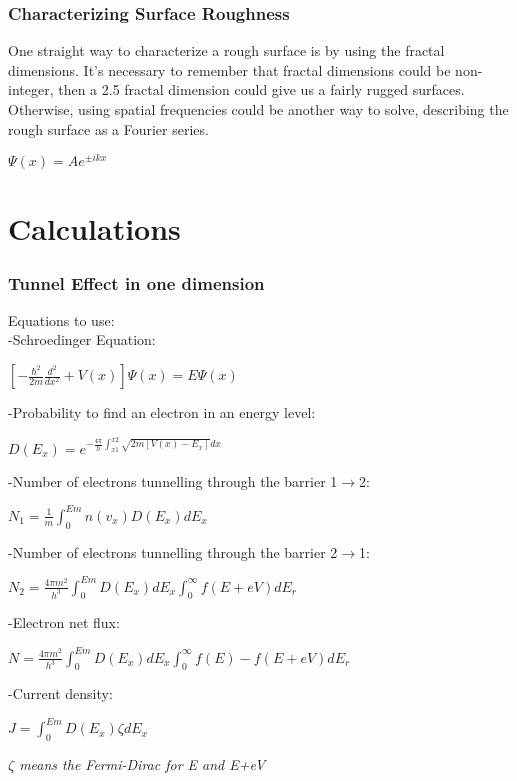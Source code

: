 \documentclass[11pt,a4paper,draft]{article}
\begin{document}
\section{Characterizing Surface Roughness}
One straight way to characterize a rough surface is by using the fractal dimensions. It's necessary to remember that fractal dimensions could be non-integer, then a 2.5 fractal dimension could give us a fairly rugged surfaces. Otherwise, using spatial frequencies could be another way to solve, describing the rough surface as a Fourier series.\\
\begin{center}
$\Psi (x)=A{ e }^{ \pm ikx }$
\end{center}
\part{Calculations}
\section{Tunnel Effect in one dimension}
Equations to use:\\
-Schroedinger Equation:
\begin{center}
$ \left[ -\frac { { \hbar  }^{ 2 } }{ 2m } \frac { { d }^{ 2 } }{ d{ x }^{ 2 } } +V(x) \right] \Psi (x)=E\Psi (x) $\\
\end{center}
-Probability to find an electron in an energy level:
\begin{center}
$ \displaystyle D({ E }_{ x })={ e }^{ -\frac { 4\pi  }{ h } \int _{ x1 }^{ x2 }{ \sqrt { 2m[V(x)-{ E }_{ x }] } dx }  } $
\end{center}
-Number of electrons tunnelling through the barrier 1$ \rightarrow $2:\\
\begin{center}
$ \displaystyle { N }_{ 1 }=\frac { 1 }{ m } \int _{ 0 }^{ Em }{ n({ v }_{ x })D(E_{ x })d } E_{ x } $
\end{center}
-Number of electrons tunnelling through the barrier 2$ \rightarrow $1:\\
\begin{center}
$ \displaystyle { N }_{ 2 }=\frac { 4\pi { m }^{ 2 } }{ { h }^{ 3 } } \int _{ 0 }^{ Em }{ D(E_{ x })d } E_{ x }\int _{ 0 }^{ \infty  }{ f(E+eV)d } E_{ r } $
\end{center}
-Electron net flux:\\
\begin{center}
$\displaystyle { N }=\frac { 4\pi { m }^{ 2 } }{ { h }^{ 3 } } \int _{ 0 }^{ Em }{ D(E_{ x })d } E_{ x }\int _{ 0 }^{ \infty  }{ f(E)-f(E+eV)d } E_{ r } $
\end{center}
-Current density:\\
\begin{center}
$ J=\int _{ 0 }^{ Em }{ D({ E }_{ x })\zeta d } { E }_{ x } $\\ \begin{tiny}
\emph{$\zeta$ means the Fermi-Dirac for E and E+eV}
\end{tiny}
\end{center}
\end{document}
